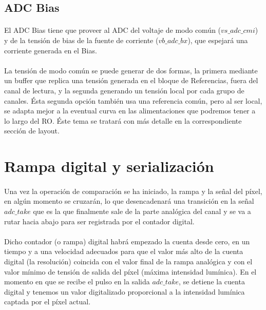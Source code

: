 \subsection{ADC Bias}

\paragraph{}
El ADC Bias tiene que proveer al ADC del voltaje de modo común ($vs\_adc\_cmi$) y
de la tensión de bias de la fuente de corriente ($vb\_adc\_bx$), que espejará
una corriente generada en el Bias.

\paragraph{}
La tensión de modo común se puede generar de dos formas, la primera mediante un
buffer que replica una tensión generada en el bloque de Referencias, fuera del
canal de lectura, y la segunda generando un tensión local por cada grupo de canales.
Ésta segunda opción también usa una referencia común, pero al ser local, se adapta
mejor a la eventual curva en las alimentaciones que podremos tener a lo largo
del RO. Éste tema se tratará con más detalle en la correspondiente sección de layout.


\section{Rampa digital y serialización}

\paragraph{}
Una vez la operación de comparación se ha iniciado, la rampa y la señal del píxel,
en algún momento se cruzarán, lo que desencadenará una transición en la señal
$adc\_take$ que es la que finalmente sale de la parte analógica del canal y se va
a rutar hacia abajo para ser registrada por el contador digital.

\paragraph{}
Dicho contador (o rampa) digital habrá empezado la cuenta desde cero, en un tiempo y a una
velocidad adecuados para que el valor más alto de la cuenta digital (la resolución)
coincida con el valor final de la rampa analógica y con el valor mínimo de tensión
de salida del píxel (máxima intensidad lumínica). En el momento en que se recibe
el pulso en la salida $adc\_take$, se detiene la cuenta digital y tenemos un valor
digitalizado proporcional a la intensidad lumínica captada por el píxel actual.

